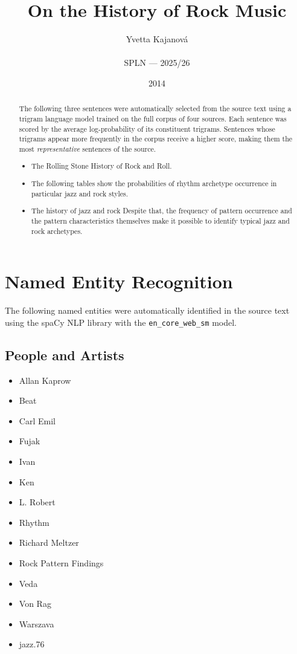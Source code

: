\documentclass[12pt,a4paper]{article}
\title{\textbf{On the History of Rock Music}}
\author{Yvetta Kajanov\'a \\\\
\small SPLN --- 2025/26}
\date{2014}
\begin{document}
\maketitle

\begin{abstract}
The following three sentences were automatically selected from the source text
using a trigram language model trained on the full corpus of four sources.
Each sentence was scored by the average log-probability of its constituent
trigrams. Sentences whose trigrams appear more frequently in the corpus
receive a higher score, making them the most \emph{representative} sentences
of the source.

\begin{itemize}
  \item The Rolling Stone History of Rock and Roll.
  \item The following tables show the probabilities of rhythm archetype occurrence in particular jazz and rock styles.
  \item The history of jazz and rock Despite that, the frequency of pattern occurrence and the pattern characteristics themselves make it possible to identify typical jazz and rock archetypes.
\end{itemize}
\end{abstract}

\section{Named Entity Recognition}

The following named entities were automatically identified in the source
text using the spaCy NLP library with the \texttt{en\_core\_web\_sm} model.

\subsection{People and Artists}
\begin{itemize}
  \item Allan Kaprow
  \item Beat
  \item Carl Emil
  \item Fujak
  \item Ivan
  \item Ken
  \item L. Robert
  \item Rhythm
  \item Richard Meltzer
  \item Rock Pattern Findings
  \item Veda
  \item Von Rag
  \item Warszava
  \item jazz.76
\end{itemize}
\end{document}
